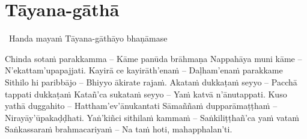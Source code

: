 \section{Tāyana-gāthā}
\label{tayana-gatha}

\begin{intro}
  \anglebracketleft\ \hspace{-0.5mm}Handa mayaṁ Tāyana-gāthāyo bhaṇāmase \hspace{-0.5mm}\anglebracketright\
\end{intro}

Chinda sotaṁ parakkamma – Kāme panūda brāhmaṇa
Nappahāya muni kāme – N'ekattam'upapajjati.
Kayirā ce kayirāth'enaṁ – Daḷham'enaṁ parakkame
Sithilo hi paribbājo – Bhiyyo ākirate rajaṁ.
Akataṁ dukkaṭaṁ seyyo – Pacchā tappati dukkaṭaṁ
Katañ'ca sukataṁ seyyo – Yaṁ katvā n'ānutappati.
Kuso yathā duggahito – Hattham'ev'ānukantati
Sāmaññaṁ dupparāmaṭṭhaṁ – Nirayāy'ūpakaḍḍhati.
Yaṅ'kiñci sithilaṁ kammaṁ – Saṅkiliṭṭhañ'ca yaṁ vataṁ
Saṅkassaraṁ brahmacariyaṁ – Na taṁ hoti, mahapphalan'ti.

\clearpage
